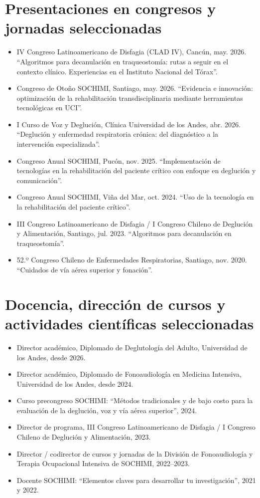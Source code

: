 \documentclass[10pt,a4paper]{article}
\begin{document}
\section*{Presentaciones en congresos y jornadas seleccionadas}
\begin{itemize}
  \item IV Congreso Latinoamericano de Disfagia (CLAD IV), Cancún, may. 2026. ``Algoritmos para decanulación en traqueostomía: rutas a seguir en el contexto clínico. Experiencias en el Instituto Nacional del Tórax''.
  \item Congreso de Otoño SOCHIMI, Santiago, may. 2026. ``Evidencia e innovación: optimización de la rehabilitación transdisciplinaria mediante herramientas tecnológicas en UCI''.
  \item I Curso de Voz y Deglución, Clínica Universidad de los Andes, abr. 2026. ``Deglución y enfermedad respiratoria crónica: del diagnóstico a la intervención especializada''.
  \item Congreso Anual SOCHIMI, Pucón, nov. 2025. ``Implementación de tecnologías en la rehabilitación del paciente crítico con enfoque en deglución y comunicación''.
  \item Congreso Anual SOCHIMI, Viña del Mar, oct. 2024. ``Uso de la tecnología en la rehabilitación del paciente crítico''.
  \item III Congreso Latinoamericano de Disfagia / I Congreso Chileno de Deglución y Alimentación, Santiago, jul. 2023. ``Algoritmos para decanulación en traqueostomía''.
  \item 52.º Congreso Chileno de Enfermedades Respiratorias, Santiago, nov. 2020. ``Cuidados de vía aérea superior y fonación''.
\end{itemize}

\section*{Docencia, dirección de cursos y actividades científicas seleccionadas}
\begin{itemize}
  \item Director académico, Diplomado de Deglutología del Adulto, Universidad de los Andes, desde 2026.
  \item Director académico, Diplomado de Fonoaudiología en Medicina Intensiva, Universidad de los Andes, desde 2024.
  \item Curso precongreso SOCHIMI: ``Métodos tradicionales y de bajo costo para la evaluación de la deglución, voz y vía aérea superior'', 2024.
  \item Director de programa, III Congreso Latinoamericano de Disfagia / I Congreso Chileno de Deglución y Alimentación, 2023.
  \item Director / codirector de cursos y jornadas de la División de Fonoaudiología y Terapia Ocupacional Intensiva de SOCHIMI, 2022--2023.
  \item Docente SOCHIMI: ``Elementos claves para desarrollar tu investigación'', 2021 y 2022.
\end{itemize}
\end{document}
